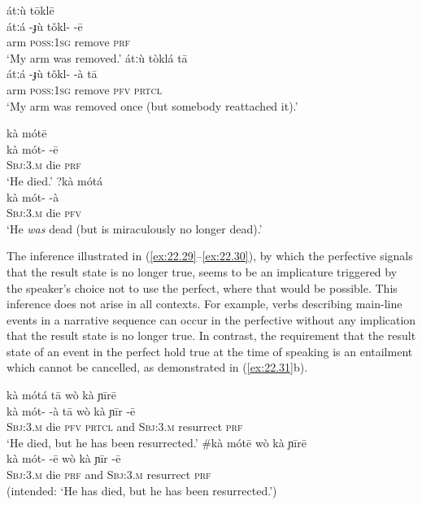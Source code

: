 \ea \label{ex:22.29}
\ea  \glll átːù  {}  tōklē\\
átːá  -ɟù  tǒkl-  -ē\\
arm  \textsc{poss:1sg}  remove  \textsc{prf}\\
\glt ‘My arm was removed.’
\ex \glll  átːù  {}  tòklá  {}  tā\\
átːá  -ɟù  tǒkl-  -à  tā\\
arm  \textsc{poss:1sg}  remove  \textsc{pfv}  \textsc{prtcl}\\
\glt ‘My arm was removed once (but somebody reattached it).’
\z \z

\ea \label{ex:22.30}
\ea  \glll kà  mótē\\
kà  mót-  -ē\\
\textsc{Sbj:3.m}  die  \textsc{prf}\\
\glt ‘He died.’
\ex \glll ?kà  mótá\\
 kà  mót-  -à\\
\textsc{Sbj:3.m}  die  \textsc{pfv}\\
\glt ‘He \textit{was} dead (but is miraculously no longer dead).’
\z \z


The inference illustrated in (\ref{ex:22.29}--\ref{ex:22.30}), by which the perfective signals that the result state is no longer true, seems to be an implicature triggered by the speaker’s choice not to use the perfect, where that would be possible. This inference does not arise in all contexts. For example, verbs describing main-line events in a narrative sequence can occur in the perfective without any implication that the result state is no longer true. In contrast, the requirement that the result state of an event in the perfect hold true at the time of speaking is an entailment which cannot be cancelled, as demonstrated in (\ref{ex:22.31}b).

\ea \label{ex:22.31}
\ea  \glll kà  mótá  {}  tā  wò  kà  ɲīrē\\
kà  mót-  -à  tā  wò  kà  ɲīr  -ē\\
\textsc{Sbj:3.m}  die  \textsc{pfv}  \textsc{prtcl}  and  \textsc{Sbj:3.m}  resurrect  \textsc{prf}\\
\glt ‘He died, but he has been resurrected.’
\ex \glll  \#kà  mótē  {}  wò  kà  ɲīrē\\
  kà  mót-  -ē  wò  kà  ɲīr  -ē\\
\textsc{Sbj:3.m}  die  \textsc{prf}  and  \textsc{Sbj:3.m}  resurrect  \textsc{prf}\\
\glt (intended: ‘He has died, but he has been resurrected.’)
\z \z

